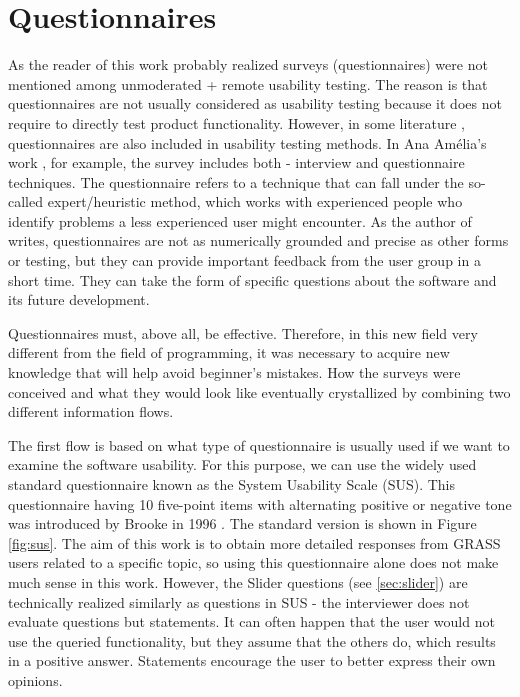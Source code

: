 \documentclass[a4paper,10pt,twoside]{article}
\begin{document}
%

\newpage
\vspace*{-1cm}
\section{Questionnaires}
\label{sec:questionnaires}

\noindent As the reader of this work probably realized surveys
(questionnaires) were not mentioned among unmoderated + remote
usability testing. The reason is that questionnaires are not usually
considered as usability testing because it does not require to
directly test product functionality. However, in some literature
\cite{amelia} \cite{sixusability}, questionnaires are also included in
usability testing methods. In Ana Amélia's work \cite{amelia}, for
example, the survey includes both - interview and questionnaire
techniques. The questionnaire refers to a technique that can fall
under the so-called expert/heuristic method, which works with
experienced people who identify problems a less experienced user might
encounter. As the author of \cite{sixusability} writes, questionnaires
are not as numerically grounded and precise as other forms or testing,
but they can provide important feedback from the user group in a short
time. They can take the form of specific questions about the software
and its future development.

Questionnaires must, above all, be effective. Therefore, in this new
field very different from the field of programming, it was necessary
to acquire new knowledge that will help avoid beginner's mistakes. How
the surveys were conceived and what they would look like eventually
crystallized by combining two different information flows.

The first flow is based on what type of questionnaire is usually used
if we want to examine the software usability. For this purpose, we can
use the widely used standard questionnaire known as the System
Usability Scale (SUS). This questionnaire having 10 five-point items
with alternating positive or negative tone was introduced by Brooke in
1996 \cite{sus}. The standard version is shown in Figure
\ref{fig:sus}. The aim of this work is to obtain more detailed
responses from GRASS users related to a specific topic, so using this
questionnaire alone does not make much sense in this work. However,
the Slider questions (see \ref{sec:slider}) are technically realized
similarly as questions in SUS - the interviewer does not evaluate
questions but statements. It can often happen that the user would not
use the queried functionality, but they assume that the others do,
which results in a positive answer. Statements encourage the user to
better express their own opinions.
\end{document}
